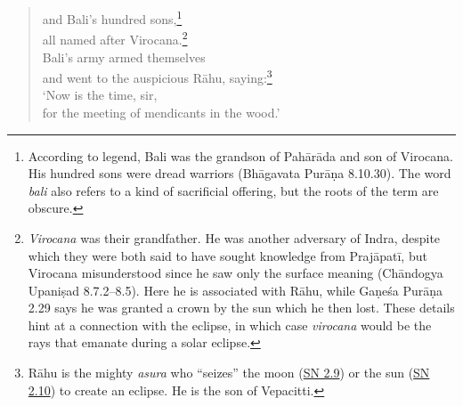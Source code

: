 \documentclass[12pt,openany]{book}%
\begin{document}
\begin{verse}
and Bali’s hundred sons,\footnote{According to legend, Bali was the grandson of \textsanskrit{Pahārāda} and son of Virocana. His hundred sons were dread warriors (\textsanskrit{Bhāgavata} \textsanskrit{Purāṇa} 8.10.30). The word \textit{bali} also refers to a kind of sacrificial offering, but the roots of the term are obscure. } \\
all named after Virocana.\footnote{\textit{Virocana} was their grandfather. He was another adversary of Indra, despite which they were both said to have sought knowledge from \textsanskrit{Prajāpatī}, but Virocana misunderstood since he saw only the surface meaning (\textsanskrit{Chāndogya} \textsanskrit{Upaniṣad} 8.7.2–8.5). Here he is associated with \textsanskrit{Rāhu}, while \textsanskrit{Gaṇeśa} \textsanskrit{Purāṇa} 2.29 says he was granted a crown by the sun which he then lost. These details hint at a connection with the eclipse, in which case \textit{virocana} would be the rays that emanate during a solar eclipse. } \\
Bali’s army armed themselves \\
and went to the auspicious \textsanskrit{Rāhu}, saying:\footnote{\textsanskrit{Rāhu} is the mighty \textit{asura} who “seizes” the moon (\href{https://suttacentral.net/sn2.9/en/sujato}{SN 2.9}) or the sun (\href{https://suttacentral.net/sn2.10/en/sujato}{SN 2.10}) to create an eclipse. He is the son of Vepacitti. } \\
‘Now is the time, sir, \\
for the meeting of mendicants in the wood.’ 


\end{verse}
\end{document}
